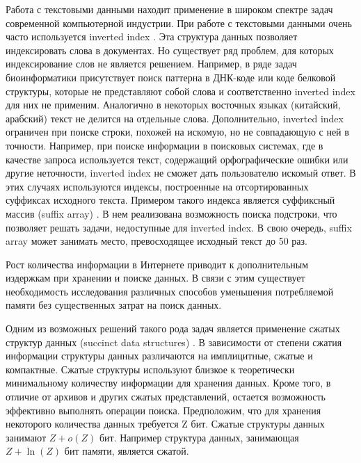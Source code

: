 

Работа с текстовыми данными находит применение в широком спектре задач современной компьютерной индустрии.
При работе с текстовыми данными очень часто используется inverted index \cite{zobel2006inverted}. Эта структура данных
позволяет индексировать слова в документах. Но существует ряд проблем, для которых индексирование слов
не является решением.
Например, в ряде задач биоинформатики \cite{tsuruoka2008facta} присутствует поиск паттерна в ДНК-коде или коде белковой структуры,
которые не представляют собой слова и соответственно inverted index для них не применим.
Аналогично в некоторых восточных языках (китайский, арабский) текст не делится на отдельные слова.
Дополнительно, inverted index ограничен при поиске строки, похожей на искомую, но не совпадающую с ней в точности.
Например, при поиске информации в поисковых системах, где в качестве запроса используется текст, содержащий
орфографические ошибки или другие неточности, inverted index не сможет дать пользователю искомый ответ.
В этих случаях используются индексы, построенные на отсортированных суффиксах исходного текста.
Примером такого индекса является суффиксный массив (suffix array) \cite{manber1993suffix}. В нем реализована возможность поиска подстроки,
что позволяет решать задачи, недоступные для inverted index. В свою очередь, suffix array может занимать
место, превосходящее исходный текст до 50 раз.

Рост количества информации в Интернете приводит к дополнительным издержкам при хранении и поиске данных.
В связи с этим существует необходимость исследования различных способов уменьшения потребляемой памяти без
существенных затрат на поиск данных.

Одним из возможных решений такого рода задач является применение сжатых структур данных
(succinct data structures) \cite{jacobson1988succinct}.
В зависимости от степени сжатия информации структуры данных различаются на имплицитные, сжатые и компактные.
Сжатые структуры используют близкое к теоретически минимальному количеству информации для хранения данных.
Кроме того, в отличие от архивов и других сжатых представлений, остается возможность
эффективно выполнять операции поиска.
Предположим, что для хранения некоторого количества данных требуется Z бит.
Сжатые структуры данных занимают \(Z + o(Z)\) бит. Например структура данных, занимающая \(Z + \ln(Z)\) бит памяти,
является сжатой.


